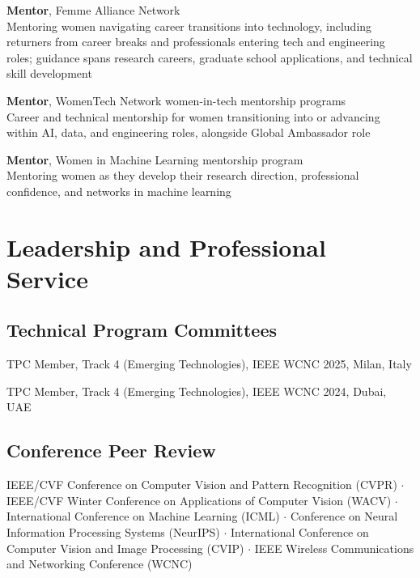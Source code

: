 \documentclass[11pt, letterpaper]{article}
\newcommand{\entry}[2]{%
  \begin{list}{}{%
    \setlength{\leftmargin}{0.17\linewidth}%
    \setlength{\labelwidth}{0.15\linewidth}%
    \setlength{\labelsep}{0.02\linewidth}%
    \setlength{\topsep}{3pt}%
    \setlength{\parsep}{2pt}%
    \setlength{\itemsep}{0pt}%
    \renewcommand{\makelabel}[1]{\parbox[t]{0.15\linewidth}{\small\raggedright\color{uwred}##1}\hfill}%
  }%
  \item[{#1}] #2%
  \end{list}%
}
\newcommand{\role}[1]{{\color{uwred}\textbf{#1}}}
\newcommand{\yearentry}[2]{%
  \begin{list}{}{%
    \setlength{\leftmargin}{0.12\linewidth}%
    \setlength{\labelwidth}{0.10\linewidth}%
    \setlength{\labelsep}{0.02\linewidth}%
    \setlength{\topsep}{2pt}%
    \setlength{\parsep}{2pt}%
    \setlength{\itemsep}{0pt}%
    \renewcommand{\makelabel}[1]{\parbox[t]{0.10\linewidth}{\small\raggedright\color{uwred}##1}\hfill}%
  }%
  \item[{#1}] #2%
  \end{list}%
}
\begin{document}
\entry{2026 --\\Present}{%
  \role{Mentor}, Femme Alliance Network\\
  Mentoring women navigating career transitions into technology, including returners from career breaks and professionals entering tech and engineering roles; guidance spans research careers, graduate school applications, and technical skill development
}

\entry{2023 --\\Present}{%
  \role{Mentor}, WomenTech Network women-in-tech mentorship programs\\
  Career and technical mentorship for women transitioning into or advancing within AI, data, and engineering roles, alongside Global Ambassador role
}

\entry{Oct 2024 --\\Present}{%
  \role{Mentor}, Women in Machine Learning mentorship program\\
  Mentoring women as they develop their research direction, professional confidence, and networks in machine learning
}

\section{Leadership and Professional Service}

\subsection*{Technical Program Committees}

\yearentry{2024}{TPC Member, Track 4 (Emerging Technologies), IEEE WCNC 2025, Milan, Italy}
\yearentry{2023}{TPC Member, Track 4 (Emerging Technologies), IEEE WCNC 2024, Dubai, UAE}

\subsection*{Conference Peer Review}

\noindent IEEE/CVF Conference on Computer Vision and Pattern Recognition (CVPR) $\cdot$ IEEE/CVF Winter Conference on Applications of Computer Vision (WACV) $\cdot$ International Conference on Machine Learning (ICML) $\cdot$ Conference on Neural Information Processing Systems (NeurIPS) $\cdot$ International Conference on Computer Vision and Image Processing (CVIP) $\cdot$ IEEE Wireless Communications and Networking Conference (WCNC)
\end{document}
